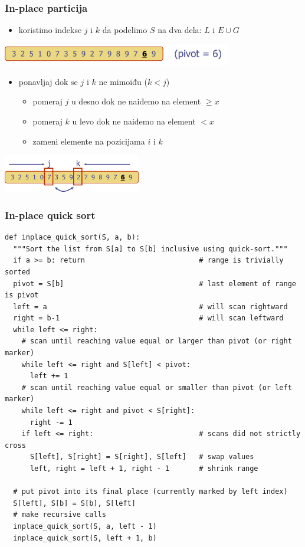 \documentclass[compress,aspectratio=169]{beamer}
\begin{document}
\begin{frame}[fragile]
  \frametitle{In-place particija}
  \begin{itemize}
    \item koristimo indekse $j$ i $k$ da podelimo $S$ na dva dela: $L$ i $E\cup G$
  \end{itemize}
  \begin{center}
    \includegraphics[width=10cm]{asp-12-pic26.png}
  \end{center}
  \begin{itemize}
    \item ponavljaj dok se $j$ i $k$ ne mimoiđu ($k<j$)
    \begin{itemize}
      \item pomeraj $j$ u desno dok ne naiđemo na element $\geq x$ 
      \item pomeraj $k$ u levo dok ne naiđemo na element $< x$
      \item zameni elemente na pozicijama $i$ i $k$ 
    \end{itemize}
  \end{itemize}
  \begin{center}
    \includegraphics[width=6cm]{asp-12-pic27.png}
  \end{center}
\end{frame}

\begin{frame}[fragile,shrink=25]
  \frametitle{In-place quick sort}
\begin{verbatim}
def inplace_quick_sort(S, a, b):
  """Sort the list from S[a] to S[b] inclusive using quick-sort."""
  if a >= b: return                           # range is trivially sorted
  pivot = S[b]                                # last element of range is pivot
  left = a                                    # will scan rightward
  right = b-1                                 # will scan leftward
  while left <= right:
    # scan until reaching value equal or larger than pivot (or right marker)
    while left <= right and S[left] < pivot:
      left += 1
    # scan until reaching value equal or smaller than pivot (or left marker)
    while left <= right and pivot < S[right]:
      right -= 1
    if left <= right:                         # scans did not strictly cross
      S[left], S[right] = S[right], S[left]   # swap values
      left, right = left + 1, right - 1       # shrink range

  # put pivot into its final place (currently marked by left index)
  S[left], S[b] = S[b], S[left]
  # make recursive calls
  inplace_quick_sort(S, a, left - 1)
  inplace_quick_sort(S, left + 1, b)
\end{verbatim}
\end{frame}
\end{document}
